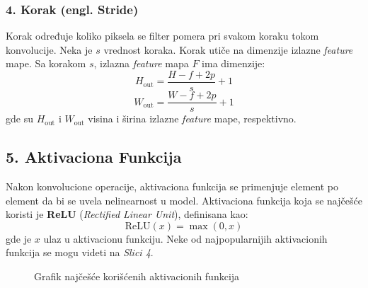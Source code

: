\documentclass[12pt]{article}
\begin{document}
   \subsubsection*{4. Korak (engl. Stride)}
   Korak određuje koliko piksela se filter pomera pri svakom koraku tokom konvolucije. 
   Neka je \( s \) vrednost koraka. Korak utiče na dimenzije izlazne \textit{feature} mape. 
   Sa korakom \( s \), izlazna \textit{feature} mapa \( F \) ima dimenzije:
   \[
      H_{\text{out}} = \frac{H - f + 2p}{s} + 1
   \]
   \[
   W_{\text{out}} = \frac{W - f + 2p}{s} + 1
   \]
   gde su \( H_{\text{out}} \) i \( W_{\text{out}} \) visina i širina izlazne \textit{feature} mape, 
   respektivno.

   \subsection*{5. Aktivaciona Funkcija}

   Nakon konvolucione operacije, aktivaciona funkcija se primenjuje element po element da bi se 
   uvela nelinearnost u model. Aktivaciona funkcija koja se najčešće koristi je 
   \textbf{ReLU} (\textit{Rectified Linear Unit}), definisana kao:
   \[
   \text{ReLU}(x) = \max(0, x)
   \]
   gde je \( x \) ulaz u aktivacionu funkciju. Neke od najpopularnijih aktivacionih funkcija se mogu 
   videti na \textit{Slici 4}.

   \begin{figure}[h!]
      \centering
      \caption{Grafik najčešće korišćenih aktivacionih funkcija}
      \label{fig:pop_activations}
    \end{figure}

    \newpage 
    
\end{document}
